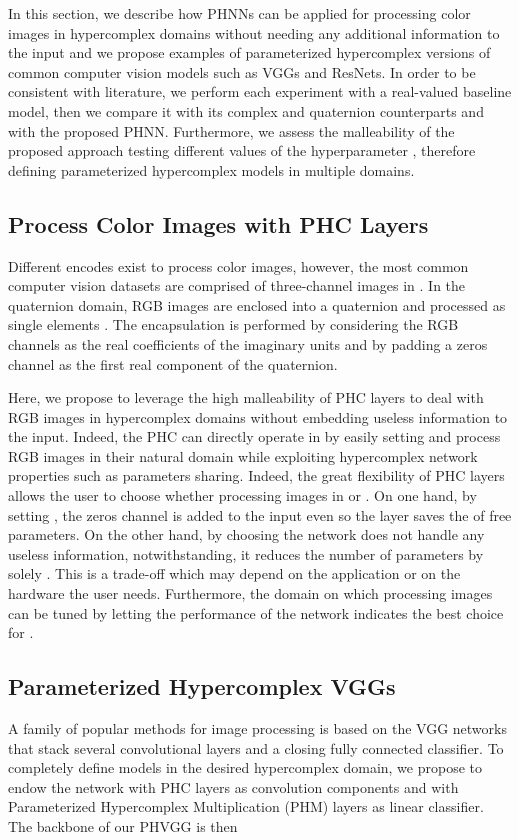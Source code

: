 \documentclass[lettersize,journal]{IEEEtran}
\begin{document}
In this section, we describe how PHNNs can be applied for processing color images in hypercomplex domains without needing any additional information to the input and we propose examples of parameterized hypercomplex versions of common computer vision models such as VGGs and ResNets. In order to be consistent with literature, we perform each experiment with a real-valued baseline model, then we compare it with its complex and quaternion counterparts and with the proposed PHNN. Furthermore, we assess the malleability of the proposed approach testing different values of the hyperparameter , therefore defining parameterized hypercomplex models in multiple domains.


\subsection{Process Color Images with PHC Layers}

Different encodes exist to process color images, however, the most common computer vision datasets are comprised of three-channel images in . In the quaternion domain, RGB images are enclosed into a quaternion and processed as single elements \cite{ParcolletAIR2019}. The encapsulation is performed by considering the RGB channels as the real coefficients of the imaginary units and by padding a zeros channel as the first real component of the quaternion.

Here, we propose to leverage the high malleability of PHC layers to deal with RGB images in hypercomplex domains without embedding useless information to the input. Indeed, the PHC can directly operate in  by easily setting  and process RGB images in their natural domain while exploiting hypercomplex network properties such as parameters sharing. Indeed, the great flexibility of PHC layers allows the user to choose whether processing images in  or . On one hand, by setting , the zeros channel is added to the input even so the layer saves the  of free parameters. On the other hand, by choosing  the network does not handle any useless information, notwithstanding, it reduces the number of parameters by solely . This is a trade-off which may depend on the application or on the hardware the user needs. Furthermore, the domain on which processing images can be tuned by letting the performance of the network indicates the best choice for .




\subsection{Parameterized Hypercomplex VGGs}
A family of popular methods for image processing is based on the VGG networks \cite{VGG2015} that stack several convolutional layers and a closing fully connected classifier. To completely define models in the desired hypercomplex domain, we propose to endow the network with PHC layers as convolution components and with Parameterized Hypercomplex Multiplication (PHM) layers \cite{Zhang2021PHM} as linear classifier. The backbone of our PHVGG is then
\end{document}
